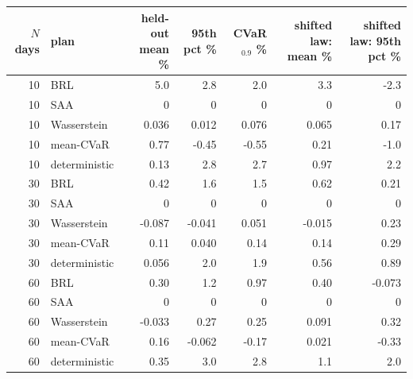 \begin{tabular}{rlrrrrr}
\toprule
$N$ days & plan & held-out mean \% & 95th pct \% & CVaR$_{0.9}$ \% & shifted law: mean \% & shifted law: 95th pct \% \\
\midrule
10 & BRL & 5.0 & 2.8 & 2.0 & 3.3 & -2.3 \\
10 & SAA & 0 & 0 & 0 & 0 & 0 \\
10 & Wasserstein & 0.036 & 0.012 & 0.076 & 0.065 & 0.17 \\
10 & mean-CVaR & 0.77 & -0.45 & -0.55 & 0.21 & -1.0 \\
10 & deterministic & 0.13 & 2.8 & 2.7 & 0.97 & 2.2 \\
30 & BRL & 0.42 & 1.6 & 1.5 & 0.62 & 0.21 \\
30 & SAA & 0 & 0 & 0 & 0 & 0 \\
30 & Wasserstein & -0.087 & -0.041 & 0.051 & -0.015 & 0.23 \\
30 & mean-CVaR & 0.11 & 0.040 & 0.14 & 0.14 & 0.29 \\
30 & deterministic & 0.056 & 2.0 & 1.9 & 0.56 & 0.89 \\
60 & BRL & 0.30 & 1.2 & 0.97 & 0.40 & -0.073 \\
60 & SAA & 0 & 0 & 0 & 0 & 0 \\
60 & Wasserstein & -0.033 & 0.27 & 0.25 & 0.091 & 0.32 \\
60 & mean-CVaR & 0.16 & -0.062 & -0.17 & 0.021 & -0.33 \\
60 & deterministic & 0.35 & 3.0 & 2.8 & 1.1 & 2.0 \\
\bottomrule
\end{tabular}
